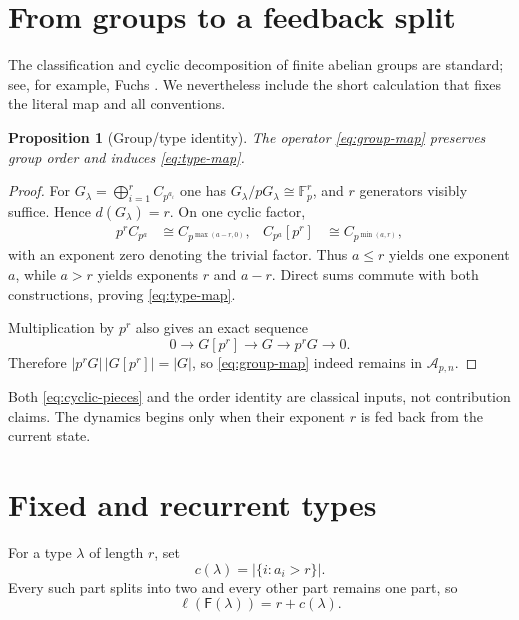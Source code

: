 \documentclass[10pt,a4paper]{amsart}
\newtheorem{proposition}[theorem]{Proposition}
\theoremstyle{definition}
\theoremstyle{remark}
\newcommand{\RF}{\mathsf F}
\newcommand{\len}{\ell}
\begin{document}
\section{From groups to a feedback split}

The classification and cyclic decomposition of finite abelian groups are
standard; see, for example, Fuchs \cite{Fuchs2015}.  We nevertheless include
the short calculation that fixes the literal map and all conventions.

\begin{proposition}[Group/type identity]\label{prop:type}
The operator \eqref{eq:group-map} preserves group order and induces
\eqref{eq:type-map}.
\end{proposition}

\begin{proof}
For $G_\lambda=\bigoplus_{i=1}^rC_{p^{a_i}}$ one has
$G_\lambda/pG_\lambda\cong\mathbb F_p^r$, and $r$ generators visibly
suffice.  Hence $d(G_\lambda)=r$.  On one cyclic factor,
\begin{align}\label{eq:cyclic-pieces}
 p^rC_{p^a}&\cong C_{p^{\max(a-r,0)}},&
 C_{p^a}[p^r]&\cong C_{p^{\min(a,r)}},
\end{align}
with an exponent zero denoting the trivial factor.  Thus $a\leq r$ yields
one exponent $a$, while $a>r$ yields exponents $r$ and $a-r$.  Direct sums
commute with both constructions, proving \eqref{eq:type-map}.

Multiplication by $p^r$ also gives an exact sequence
\[
 0\longrightarrow G[p^r]\longrightarrow G
   \longrightarrow p^rG\longrightarrow0.
\]
Therefore $|p^rG|\,|G[p^r]|=|G|$, so \eqref{eq:group-map} indeed remains in
$\mathcal A_{p,n}$.
\end{proof}

Both \eqref{eq:cyclic-pieces} and the order identity are classical inputs,
not contribution claims.  The dynamics begins only when their exponent $r$
is fed back from the current state.

\section{Fixed and recurrent types}

For a type $\lambda$ of length $r$, set
\begin{equation}\label{eq:split-count}
                         c(\lambda)=|\{i:a_i>r\}|.
\end{equation}
Every such part splits into two and every other part remains one part, so
\begin{equation}\label{eq:rank-rise}
                  \len(\RF(\lambda))=r+c(\lambda).
\end{equation}
\end{document}
